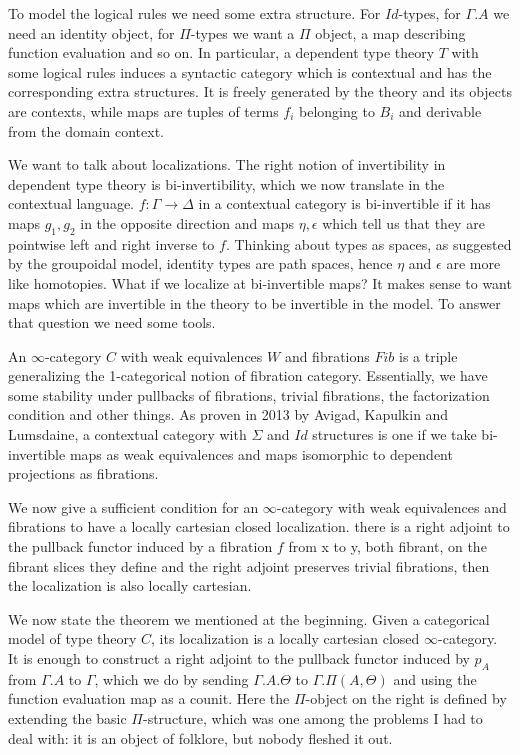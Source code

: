 \documentclass{minimal}
\newcommand{\Id}{Id}
\begin{document}
To model the logical rules we need some extra structure. For $\Id$-types, for
$\Gamma.A$ we need an identity object, for $\Pi$-types we want a $\Pi$ object,
a map describing function evaluation and so on. In particular, a dependent type
theory $T$ with some logical rules induces a syntactic category which is
contextual and has the corresponding extra structures. It is freely generated by
the theory and its objects are contexts, while maps are tuples of terms $f_i$
belonging to $B_i$ and derivable from the domain context.

We want to talk about localizations. The right notion of invertibility in
dependent type theory is bi-invertibility, which we now translate in the
contextual language.
$f\colon\Gamma\rightarrow\Delta$ in a contextual category is bi-invertible if it
has
maps $g_1,g_2$ in the opposite direction and maps $\eta,\epsilon$ which tell us
that they are pointwise left and right inverse to $f$. Thinking about types as
spaces, as suggested by the groupoidal model, identity types are path spaces,
hence $\eta$ and $\epsilon$ are more like homotopies. What if we localize at
bi-invertible maps? It makes sense to want maps which are invertible in the
theory to be invertible in the model. To answer that question we need some tools.

An $\infty$-category $C$ with weak equivalences $W$ and fibrations $Fib$ is a
triple generalizing the 1-categorical notion of fibration category. Essentially,
we have some stability under pullbacks of fibrations, trivial fibrations, the
factorization condition and other things. As proven in 2013 by Avigad, Kapulkin
and Lumsdaine, a contextual category with $\Sigma$
and $\Id$ structures is one if we take bi-invertible maps as weak equivalences
and maps isomorphic to dependent projections as fibrations.

We now give a sufficient condition for an $\infty$-category with weak
equivalences and fibrations to have a locally cartesian closed localization.
there is a right adjoint to the pullback functor
induced by a fibration $f$ from x to y, both fibrant, on the fibrant slices they
define and the right adjoint preserves trivial fibrations, then the localization
is also locally cartesian.

We now state the theorem we mentioned at the beginning. Given a categorical
model of type theory $C$, its localization is a locally cartesian closed
$\infty$-category. It is enough to construct a right adjoint to the pullback
functor induced by $p_A$ from $\Gamma.A$ to $\Gamma$, which we do by sending
$\Gamma.A.\Theta$ to $\Gamma.\Pi(A,\Theta)$ and using the function evaluation
map as a counit. Here the $\Pi$-object on the right
is defined by extending the basic $\Pi$-structure, which was one among the
problems I had to deal with: it is an object of folklore, but nobody fleshed it
out.
\end{document}
